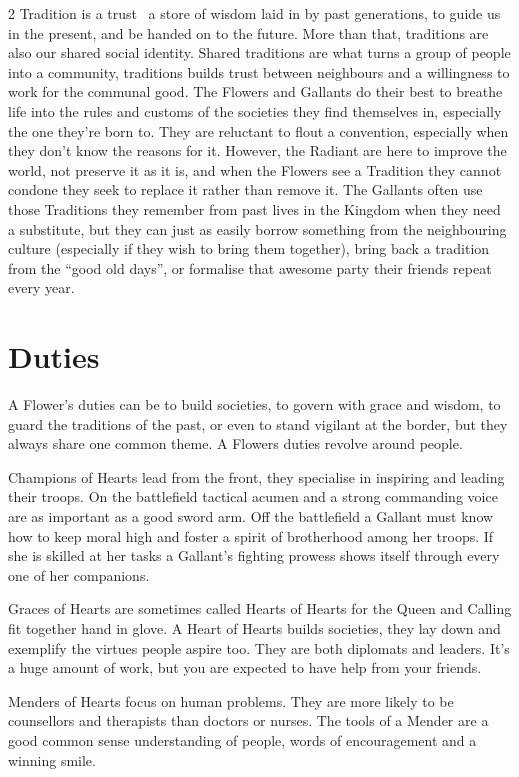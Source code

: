 \begin{multicols}{2}
Tradition is a trust \textendash\, a store of wisdom laid in by past generations, to guide us in the present, and be handed on to the future. More than that, traditions are also our shared social identity. Shared traditions are what turns a group of people into a community, traditions builds trust between neighbours and a willingness to work for the communal good. The Flowers and Gallants do their best to breathe life into the rules and customs of the societies they find themselves in, especially the one they're born to. They are reluctant to flout a convention, especially when they don't know the reasons for it.  However, the Radiant are here to improve the world, not preserve it as it is, and when the Flowers see a Tradition they cannot condone they seek to replace it rather than remove it. The Gallants often use those Traditions they remember from past lives in the Kingdom when they need a substitute, but they can just as easily borrow something from the neighbouring culture (especially if they wish to bring them together), bring back a tradition from the \textquotedblleft good old days\textquotedblright, or formalise that awesome party their friends repeat every year. 

\section*{Duties}

A Flower's duties can be to build societies, to govern with grace and wisdom, to guard the traditions of the past, or even to stand vigilant at the border, but they always share one common theme. A Flowers duties revolve around people. 

Champions of Hearts lead from the front, they specialise in inspiring and leading their troops. On the battlefield tactical acumen and a strong commanding voice are as important as a good sword arm. Off the battlefield a Gallant must know how to keep moral high and foster a spirit of brotherhood among her troops. If she is skilled at her tasks a Gallant's fighting prowess shows itself through every one of her companions. 

Graces of Hearts are sometimes called Hearts of Hearts for the Queen and Calling fit together hand in glove. A Heart of Hearts builds societies, they lay down and exemplify the virtues people aspire too. They are both diplomats and leaders. It's a huge amount of work, but you are expected to have help from your friends. 

Menders of Hearts focus on human problems. They are more likely to be counsellors and therapists than doctors or nurses. The tools of a Mender are a good common sense understanding of people, words of encouragement and a winning smile. 


\end{multicols}
